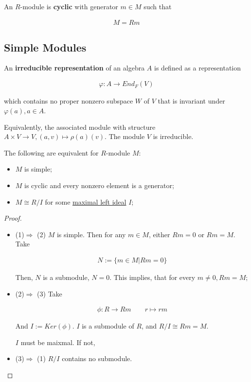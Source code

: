 \documentclass[Total.tex]{subfiles}
\begin{document}
	\begin{Def}
		An $R$-module is \textbf{cyclic} with generator $m\in M$ such that
		
		\begin{gather*}
			M=Rm
		\end{gather*} 
	\end{Def}
	
	\subsection{Simple Modules}
	
	\begin{Def}
		An \textbf{irreducible representation} of an algebra $A$ is defined as a representation
		
		\begin{gather*}
			\varphi:A\rightarrow End_F(V)
		\end{gather*}
		
		which contains no proper nonzero subspace $W$ of $V$ that is invariant under $\varphi(a),a\in A$.
	\end{Def}
	
	Equivalently, the associated module with structure $A\times V\rightarrow V,(a,v)\mapsto \rho(a)(v)$. The module $V$ is irreducible. 
	
	\begin{proposition}
		The following are equivalent for $R$-module $M$:
		
		\begin{itemize}
			\item $M$ is simple;
			\item $M$ is cyclic and every nonzero element is a generator;
			\item $M\cong R/I$ for some \underline{maximal left ideal} $I$;
		\end{itemize}
	\end{proposition}
	
	\begin{proof}
		\begin{itemize}
			\item (1)$\Rightarrow$ (2) $M$ is simple. Then for any $m\in M$, either $Rm=0$ or $Rm=M$. Take
			
			\begin{gather*}
				N:=\{m\in M|Rm=0\}
			\end{gather*}
			
			Then, $N$ is a submodule, $N=0$. This implies, that for every $m\not=0,Rm=M$;
			
			\item (2)$\Rightarrow$ (3) Take
			
			\begin{gather*}
				\phi:R\rightarrow Rm\qquad r\mapsto rm
			\end{gather*}
			
			And $I:=Ker(\phi)$. $I$ is a submodule of $R$, and $R/I\cong Rm=M$.
			
			$I$ must be maixmal. If not, 
			
			\item (3)$\Rightarrow$ (1) $R/I$ contains no submodule.
		\end{itemize}
	\end{proof}
	
\end{document}
